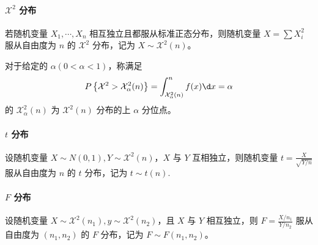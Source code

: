 \newcommand{\calX}{\mathcal{X}}

\paragraph{$\calX^2$ 分布}

若随机变量 $X_1, \cdots, X_n$ 相互独立且都服从标准正态分布，则随机变量 $X = \sum X_i^2$ 服从自由度为 $n$ 的 $\calX^2$ 分布，记为 $X \sim \calX^2(n)$。

对于给定的 $\alpha(0 < \alpha < 1)$，称满足
\[ P\left\{\calX^2 > \calX_\alpha^2(n)\right\} = \int_{\calX_\alpha^2(n)}^n f(x) \d x = \alpha  \]
的 $\calX_\alpha^2(n)$ 为 $\calX^2(n)$ 分布的上 $\alpha$ 分位点。

\paragraph{$t$ 分布}

设随机变量 $X \sim N(0, 1), Y \sim \calX^2(n)$，$X$ 与 $Y$ 互相独立，则随机变量 $t = \frac{X}{\sqrt{Y / n}}$ 服从自由度为 $n$ 的 $t$ 分布，记为 $t \sim t(n)$.

\paragraph{$F$ 分布}

设随机变量 $X \sim \calX^2(n_1), y \sim \calX^2(n_2)$，且 $X$ 与 $Y$ 相互独立，则 $F = \frac{X / n_1}{Y / n_2}$ 服从自由度为 $(n_1, n_2)$ 的 $F$ 分布，记为 $F \sim F(n_1, n_2)$。

